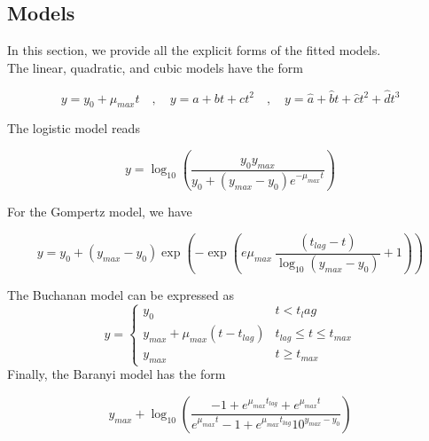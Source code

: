 \documentclass[titlepage,11pt]{article}
\begin{document}
\begin{linenumbers}
			\subsection{Models}\label{subsec:modelequations}
			In this section, we provide all the explicit forms of the fitted models.\\
			The linear, quadratic, and cubic models have the form
			\begin{linenomath*}
				\begin{equation}
				y = y_0 + \mu_{max}t \quad , \quad     y = a + bt + ct^2 \quad, \quad y = \hat{a}+ \hat{b}t + \hat{c}t^2 + \hat{d}t^3
				\end{equation}
			\end{linenomath*}
			The logistic model reads
			\begin{linenomath*}
				\begin{equation}
				y =     \log_{10}\left(\dfrac{y_0y_{max}}{y_0 + (y_{max}-y_0)e^{-\mu_{max}t}}\right)
				\end{equation}
			\end{linenomath*}
			For the Gompertz model, we have
			\begin{linenomath*}
				\begin{equation}
				y = y_0 + (y_{max}-y_0)\exp\left(-\exp\left(e\mu_{max}\ \dfrac{(t_{lag}-t)}{\log_{10}(y_{max}-y_0)}+1\right)\right)
				\end{equation}
			\end{linenomath*}
			
			The Buchanan model can be expressed as 
			\[y = \left\{
			\begin{array}{lr}
			y_0 &  t < t_lag\\
			y_{max}  + \mu_{max}(t-t_{lag})&  t_{lag} \le t \le t_{max}\\
			y_{max} & t \geq t_{max}
			\end{array}
			\right.
			\]
			Finally, the Baranyi model has the form
			
			\begin{linenomath*}
				\begin{equation}                
				y_{max} + \log_{10}\left(\dfrac{-1 + e^{\mu_{max}t_{lag}} + e^{\mu_{max}t}}{e^{\mu_{max}t}-1+e^{\mu_{max}t_{lag}}10^{y_{max}-y_0}}\right)
				\end{equation}
			\end{linenomath*}
			
			

\end{linenumbers}
\end{document}
